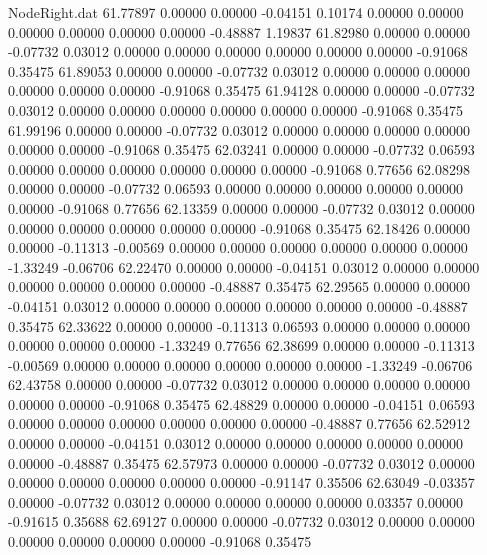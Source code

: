 \begin{filecontents}{NodeRight.dat}
  61.77897    0.00000    0.00000    -0.04151    0.10174    0.00000    0.00000    0.00000    0.00000    0.00000    0.00000   -0.48887    1.19837
  61.82980    0.00000    0.00000    -0.07732    0.03012    0.00000    0.00000    0.00000    0.00000    0.00000    0.00000   -0.91068    0.35475
  61.89053    0.00000    0.00000    -0.07732    0.03012    0.00000    0.00000    0.00000    0.00000    0.00000    0.00000   -0.91068    0.35475
  61.94128    0.00000    0.00000    -0.07732    0.03012    0.00000    0.00000    0.00000    0.00000    0.00000    0.00000   -0.91068    0.35475
  61.99196    0.00000    0.00000    -0.07732    0.03012    0.00000    0.00000    0.00000    0.00000    0.00000    0.00000   -0.91068    0.35475
  62.03241    0.00000    0.00000    -0.07732    0.06593    0.00000    0.00000    0.00000    0.00000    0.00000    0.00000   -0.91068    0.77656
  62.08298    0.00000    0.00000    -0.07732    0.06593    0.00000    0.00000    0.00000    0.00000    0.00000    0.00000   -0.91068    0.77656
  62.13359    0.00000    0.00000    -0.07732    0.03012    0.00000    0.00000    0.00000    0.00000    0.00000    0.00000   -0.91068    0.35475
  62.18426    0.00000    0.00000    -0.11313   -0.00569    0.00000    0.00000    0.00000    0.00000    0.00000    0.00000   -1.33249   -0.06706
  62.22470    0.00000    0.00000    -0.04151    0.03012    0.00000    0.00000    0.00000    0.00000    0.00000    0.00000   -0.48887    0.35475
  62.29565    0.00000    0.00000    -0.04151    0.03012    0.00000    0.00000    0.00000    0.00000    0.00000    0.00000   -0.48887    0.35475
  62.33622    0.00000    0.00000    -0.11313    0.06593    0.00000    0.00000    0.00000    0.00000    0.00000    0.00000   -1.33249    0.77656
  62.38699    0.00000    0.00000    -0.11313   -0.00569    0.00000    0.00000    0.00000    0.00000    0.00000    0.00000   -1.33249   -0.06706
  62.43758    0.00000    0.00000    -0.07732    0.03012    0.00000    0.00000    0.00000    0.00000    0.00000    0.00000   -0.91068    0.35475
  62.48829    0.00000    0.00000    -0.04151    0.06593    0.00000    0.00000    0.00000    0.00000    0.00000    0.00000   -0.48887    0.77656
  62.52912    0.00000    0.00000    -0.04151    0.03012    0.00000    0.00000    0.00000    0.00000    0.00000    0.00000   -0.48887    0.35475
  62.57973    0.00000    0.00000    -0.07732    0.03012    0.00000    0.00000    0.00000    0.00000    0.00000    0.00000   -0.91147    0.35506
  62.63049   -0.03357    0.00000    -0.07732    0.03012    0.00000    0.00000    0.00000    0.00000    0.03357    0.00000   -0.91615    0.35688
  62.69127    0.00000    0.00000    -0.07732    0.03012    0.00000    0.00000    0.00000    0.00000    0.00000    0.00000   -0.91068    0.35475

\end{filecontents}
